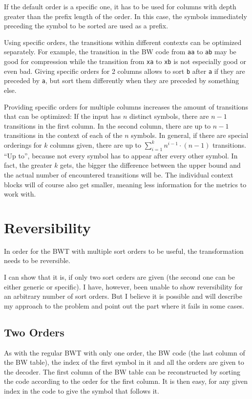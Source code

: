 \documentclass[a4paper]{scrreprt}
\begin{document}
If the default order is a specific one, it has to be used for columns with depth
greater than the prefix length of the order. In this case, the symbols
immediately preceding the symbol to be sorted are used as a prefix.

Using specific orders, the transitions within different contexts can be
optimized separately. For example, the transition in the BW code from
\texttt{aa} to \texttt{ab} may be good for compression while the transition
from \texttt{xa} to \texttt{xb} is not especially good or even bad. Giving
specific orders for 2 columns allows to sort \texttt{b} after \texttt{a} if
they are preceded by \texttt{a}, but sort them differently when they are
preceded by something else.

Providing specific orders for multiple columns increases the amount of
transitions that can be optimized: If the input has \(n\) distinct symbols,
there are \(n - 1\) transitions in the first column. In the second column, there
are up to \(n - 1\) transitions in the context of each of the \(n\) symbols. In
general, if there are special orderings for \(k\) columns given, there are up to
\(\sum_{i=1}^{k} n^{i - 1} \cdot (n - 1)\) transitions. ``Up to'', because not
every symbol has to appear after every other symbol. In fact, the greater \(k\)
gets, the bigger the difference between the upper bound and the actual number of
encountered transitions will be. The individual context blocks will of course
also get smaller, meaning less information for the metrics to work with.

\section{Reversibility}

In order for the BWT with multiple sort orders to be useful, the transformation
needs to be reversible.

I can show that it is, if only two sort orders are given (the second one can be
either generic or specific). I have, however, been unable to show reversibility
for an arbitrary number of sort orders. But I believe it is possible and will
describe my approach to the problem and point out the part where it fails in
some cases.

\subsection{Two Orders}

As with the regular BWT with only one order, the BW code (the last column of
the BW table), the index of the first symbol in it and all the orders are given
to the decoder. The first column of the BW table can be reconstructed by sorting
the code according to the order for the first column. It is then easy, for any
given index in the code to give the symbol that follows it.
\end{document}
